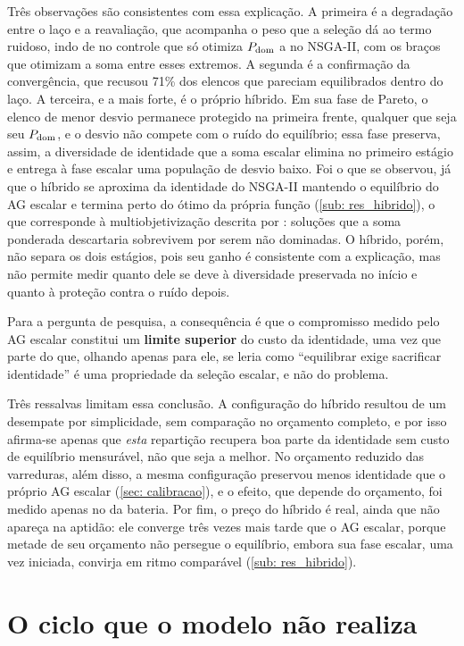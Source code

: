 Três observações são consistentes com essa explicação. A primeira é a degradação entre o laço e a reavaliação, que acompanha o peso que a seleção dá ao termo ruidoso, indo de \sobreLzero{} no controle que só otimiza $P_{\mathrm{dom}}$ a \sobreNSGA{} no NSGA-II, com os braços que otimizam a soma entre esses extremos. A segunda é a confirmação da convergência, que recusou 71\% dos elencos que pareciam equilibrados dentro do laço. A terceira, e a mais forte, é o próprio híbrido. Em sua fase de Pareto, o elenco de menor desvio permanece protegido na primeira frente, qualquer que seja seu $P_{\mathrm{dom}}$, e o desvio não compete com o ruído do equilíbrio; essa fase preserva, assim, a diversidade de identidade que a soma escalar elimina no primeiro estágio e entrega à fase escalar uma população de desvio baixo. Foi o que se observou, já que o híbrido se aproxima da identidade do NSGA-II mantendo o equilíbrio do AG escalar e termina perto do ótimo da própria função (\autoref{sub: res_hibrido}), o que corresponde à multiobjetivização descrita por : soluções que a soma ponderada descartaria sobrevivem por serem não dominadas. O híbrido, porém, não separa os dois estágios, pois seu ganho é consistente com a explicação, mas não permite medir quanto dele se deve à diversidade preservada no início e quanto à proteção contra o ruído depois.

Para a pergunta de pesquisa, a consequência é que o compromisso medido pelo AG escalar constitui um \textbf{limite superior} do custo da identidade, uma vez que parte do que, olhando apenas para ele, se leria como ``equilibrar exige sacrificar identidade'' é uma propriedade da seleção escalar, e não do problema.

Três ressalvas limitam essa conclusão. A configuração do híbrido resultou de um desempate por simplicidade, sem comparação no orçamento completo, e por isso afirma-se apenas que \textit{esta} repartição recupera boa parte da identidade sem custo de equilíbrio mensurável, não que seja a melhor. No orçamento reduzido das varreduras, além disso, a mesma configuração preservou menos identidade que o próprio AG escalar (\autoref{sec: calibracao}), e o efeito, que depende do orçamento, foi medido apenas no da bateria. Por fim, o preço do híbrido é real, ainda que não apareça na aptidão: ele converge três vezes mais tarde que o AG escalar, porque metade de seu orçamento não persegue o equilíbrio, embora sua fase escalar, uma vez iniciada, convirja em ritmo comparável (\autoref{sub: res_hibrido}).

\section{O ciclo que o modelo não realiza}
\label{sec: disc_ciclo}

